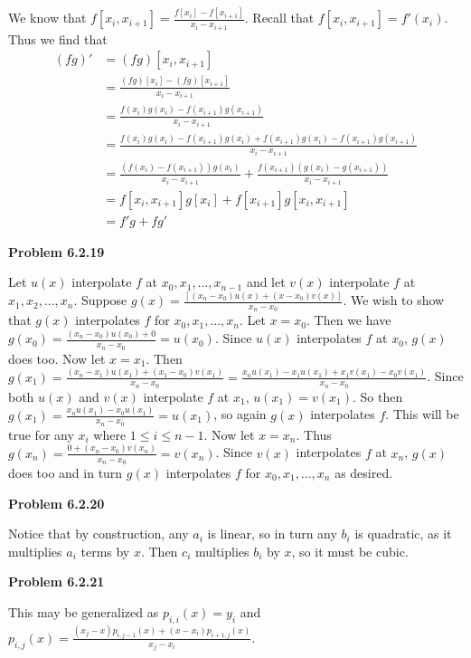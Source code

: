 \documentclass{article}
\newcommand{\Problem}[1]{\textbf{Problem #1}}
\begin{document}
We know that $f[x_i,x_{i+1}] = \displaystyle\frac{f[x_i] - f[x_{i+1}]}{x_i - x_{i+1}}$. Recall that $f[x_i,x_{i+1}] = f'(x_i)$. Thus we find that
\begin{align*}
(fg)' &= (fg)[x_i,x_{i+1}]\\ 
&= \displaystyle\frac{(fg)[x_i] - (fg)[x_{i+1}]}{x_i - x_{i+1}}	\\
&= \displaystyle\frac{f(x_i)g(x_i) - f(x_{i+1})g(x_{i+1})}{x_i-x_{i+1}}\\
&= \displaystyle\frac{f(x_i)g(x_i) -f(x_{i+1})g(x_i)+f(x_{i+1})g(x_i)- f(x_{i+1})g(x_{i+1})}{x_i-x_{i+1}}\\
&= \displaystyle\frac{(f(x_i)-f(x_{i+1}))g(x_i)}{x_i-x_{i+1}} + \displaystyle\frac{f(x_{i+1})(g(x_i)-g(x_{i+1}))}{x_i-x_{i+1}}\\
&= f[x_i,x_{i+1}]g[x_i] + f[x_{i+1}]g[x_i,x_{i+1}]\\
&= f'g + fg'
\end{align*}

\Problem{6.2.19}

Let $u(x)$ interpolate $f$ at $x_0,x_1,...,x_{n-1}$ and let $v(x)$ interpolate $f$ at $x_1,x_2,...,x_n$. Suppose $g(x) = \displaystyle\frac{[(x_n - x_0)u(x) + (x - x_0)v(x)]}{x_n-x_0}$. We wish to show that $g(x)$ interpolates $f$ for $x_0,x_1,...,x_n$. Let $x = x_0$. Then we have $g(x_0) = \displaystyle\frac{(x_n - x_0)u(x_0) + 0}{x_n - x_0} = u(x_0)$. Since $u(x)$ interpolates $f$ at $x_0$, $g(x)$ does too. Now let $x = x_1$. Then $g(x_1) = \displaystyle\frac{(x_n - x_1)u(x_1) + (x_1-x_0)v(x_1)}{x_n - x_0} = \displaystyle\frac{x_nu(x_1)-x_1u(x_1) + x_1v(x_1) - x_0v(x_1)}{x_n - x_0}$. Since both $u(x)$ and $v(x)$ interpolate $f$ at $x_1$, $u(x_1) = v(x_1)$. So then $g(x_1) = \displaystyle\frac{x_nu(x_1) - x_0u(x_1)}{x_n - x_0} = u(x_1)$, so again $g(x)$ interpolates $f$. This will be true for any $x_i$ where $1 \leq i \leq n-1$. Now let $x = x_n$. Thus $g(x_n) = \displaystyle\frac{0 + (x_n-x_0)v(x_n)}{x_n-x_0} = v(x_n)$. Since $v(x)$ interpolates $f$ at $x_n$, $g(x)$ does too and in turn $g(x)$ interpolates $f$ for $x_0,x_1,...,x_n$ as desired.

\Problem{6.2.20}

Notice that by construction, any $a_i$ is linear, so in turn any $b_i$ is quadratic, as it multiplies $a_i$ terms by $x$. Then $c_i$ multiplies $b_i$ by $x$, so it must be cubic. 

\Problem{6.2.21}

This may be generalized as $p_{i,i}(x) = y_i$ and $p_{i,j}(x) = \displaystyle\frac{(x_{j}-x)p_{i,j-1}	(x) + (x - x_i)p_{i+1,j	}(x)}{x_j - x_i}$.
\end{document}
